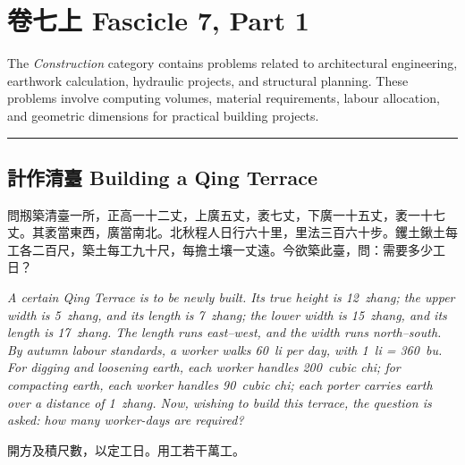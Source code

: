 \documentclass[11pt,a4paper]{article}
\newcommand{\longline}{\noindent\rule{\textwidth}{0.4pt}}
\begin{document}
\newpage

\section{卷七上 \quad Fascicle 7, Part 1}
\label{sec:fasc7a}

\begin{center}
\end{center}

\medskip

\noindent The \textit{Construction} category contains problems related to architectural engineering, earthwork calculation, hydraulic projects, and structural planning. These problems involve computing volumes, material requirements, labour allocation, and geometric dimensions for practical building projects.

\vspace{0.8em}
\longline

\subsection{計作清臺 \quad Building a Qing Terrace}

\begin{problem}
問剏築清臺一所，正高一十二丈，上廣五丈，袤七丈，下廣一十五丈，袤一十七丈。其袤當東西，廣當南北。北秋程人日行六十里，里法三百六十步。钁土鍬土每工各二百尺，築土每工九十尺，每擔土壤一丈遠。今欲築此臺，問：需要多少工日？

\textit{A certain Qing Terrace is to be newly built. Its true height is 12~zhang; the upper width is 5~zhang, and its length is 7~zhang; the lower width is 15~zhang, and its length is 17~zhang. The length runs east--west, and the width runs north--south. By autumn labour standards, a worker walks 60~li per day, with 1~li = 360~bu. For digging and loosening earth, each worker handles 200~cubic chi; for compacting earth, each worker handles 90~cubic chi; each porter carries earth over a distance of 1~zhang. Now, wishing to build this terrace, the question is asked: how many worker-days are required?}
\end{problem}

\begin{answer}
開方及積尺數，以定工日。用工若干萬工。
\end{answer}
\end{document}
